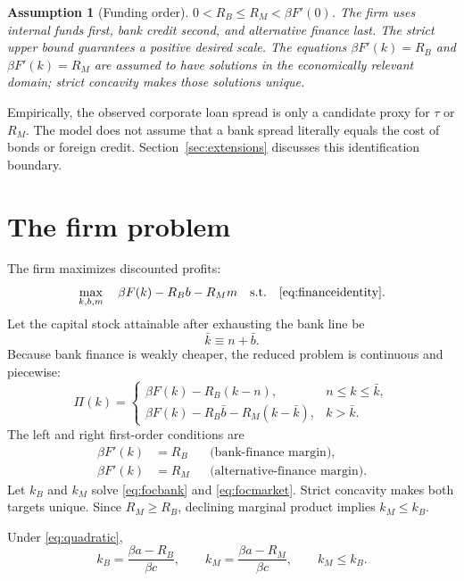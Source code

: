 \documentclass[11pt]{article}
\newtheorem{assumption}{Assumption}
\theoremstyle{definition}
\theoremstyle{remark}
\newcommand{\kb}{k_B}
\newcommand{\km}{k_M}
\newcommand{\Rb}{R_B}
\newcommand{\Rm}{R_M}
\begin{document}
\begin{assumption}[Funding order]\label{ass:fundingorder}
$0<\Rb\le\Rm<\beta F'(0)$. The firm uses internal funds first, bank credit
second, and alternative finance last. The strict upper bound guarantees a
positive desired scale. The equations $\beta F'(k)=\Rb$ and
$\beta F'(k)=\Rm$ are assumed to have solutions in the economically relevant
domain; strict concavity makes those solutions unique.
\end{assumption}

Empirically, the observed corporate loan spread is only a candidate proxy for
$\tau$ or $\Rm$. The model does not assume that a bank spread literally equals
the cost of bonds or foreign credit. Section~\ref{sec:extensions} discusses
this identification boundary.

\section{The firm problem}

The firm maximizes discounted profits:
\begin{equation}\label{eq:firmproblem}
\max_{k,b,m}\quad \beta F(k)-\Rb b-\Rm m
\quad\text{s.t.}\quad \eqref{eq:financeidentity}.
\end{equation}
Let the capital stock attainable after exhausting the bank line be
\begin{equation}
\bar k\equiv n+\bar b.
\end{equation}
Because bank finance is weakly cheaper, the reduced problem is continuous and
piecewise:
\begin{equation}\label{eq:piecewiseprofit}
\Pi(k)=
\begin{cases}
\beta F(k)-\Rb(k-n), & n\le k\le\bar k,\\[3pt]
\beta F(k)-\Rb\bar b-\Rm(k-\bar k), & k>\bar k.
\end{cases}
\end{equation}
The left and right first-order conditions are
\begin{align}
\beta F'(k)&=\Rb &&\text{(bank-finance margin)},\label{eq:focbank}\\
\beta F'(k)&=\Rm &&\text{(alternative-finance margin)}.\label{eq:focmarket}
\end{align}
Let $\kb$ and $\km$ solve \eqref{eq:focbank} and
\eqref{eq:focmarket}. Strict concavity makes both targets unique. Since
$\Rm\ge\Rb$, declining marginal product implies $\km\le\kb$.

Under \eqref{eq:quadratic},
\begin{equation}\label{eq:targets}
\kb=\frac{\beta a-\Rb}{\beta c},
\qquad
\km=\frac{\beta a-\Rm}{\beta c},
\qquad \km\le\kb.
\end{equation}
\end{document}
